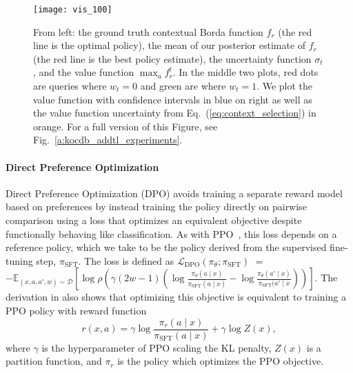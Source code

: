 \documentclass{article} \usepackage{iclr2023_conference,times}
\def\eqref#1{Eq.~(\ref{#1})}
\newcommand{\Ebb}{\mathbb{E}}
\newcommand{\Dcal}{\mathcal{D}}
\newcommand{\borda}{f_r}
\newcommand{\dpoloss}{\mathcal{L}_{\text{DPO}}}
\newcommand{\sftpolicy}{\pi_{\text{SFT}}}
\newcommand{\winner}{w}
\newcommand{\add}[1]{#1}
\newcommand{\linkfunction}{\add{\rho}}
\begin{document}
\begin{figure}
    \centering
    \texttt{[image: vis\_100]}
    \vspace{-5mm}
    \caption{\small From left: the ground truth contextual Borda function $f_r$ (the red line is the optimal policy), the mean of our posterior estimate of $f_r$ (the red line is the best policy estimate), the uncertainty function $\sigma_t$, and the value function $\max_a \borda^t$. In the middle two plots, red dots are queries where $w_t = 0$ and green are where $w_t = 1$. We plot the value function with confidence intervals in blue on right as well as the value function uncertainty from \eqref{eq:context_selection} in orange. For a full version of this Figure, see Fig.~\ref{a:kocdb_addtl_experiments}.}
    \label{fig:kocbd_viz}
    \vspace{-3mm}
\end{figure}


\paragraph{Direct Preference Optimization}
Direct Preference Optimization (DPO) \citep{dpo} avoids training a separate reward model based on preferences by instead training the policy directly on pairwise comparison using a loss that optimizes an equivalent objective despite functionally behaving like classification.
As with PPO~\citep{schulman2017proximal}, this loss depends on a reference policy, which
we take
to be the policy derived from the supervised fine-tuning step, $\sftpolicy$.
The loss is defined as
$\dpoloss(\pi_\theta; \sftpolicy)$ $=$ $-\Ebb_{(x, a, a', \add{w}) \sim \Dcal}\left[\log\linkfunction \left(\gamma(2\winner-1)\left(\log\frac{\pi_\theta(a\mid x)}{\sftpolicy(a\mid x)} - \log\frac{\pi_\theta(a'\mid x)}{\sftpolicy(a'\mid x}\right)\right)\right]$.
The derivation in \citet{dpo} also shows that optimizing this objective is equivalent to training a PPO policy with reward function
\begin{equation}
    \label{eq:dpo_reward}
    r(x, a) = \add{\gamma}\log\frac{\pi_r(a\mid x)}{\sftpolicy(a\mid x)} + \add{\gamma}\log Z(x),
\end{equation}
where $\gamma$ is the hyperparameter of PPO scaling the KL penalty, $Z(x)$ is a partition function, and $\pi_r$ is the policy which optimizes the PPO objective.
\end{document}
